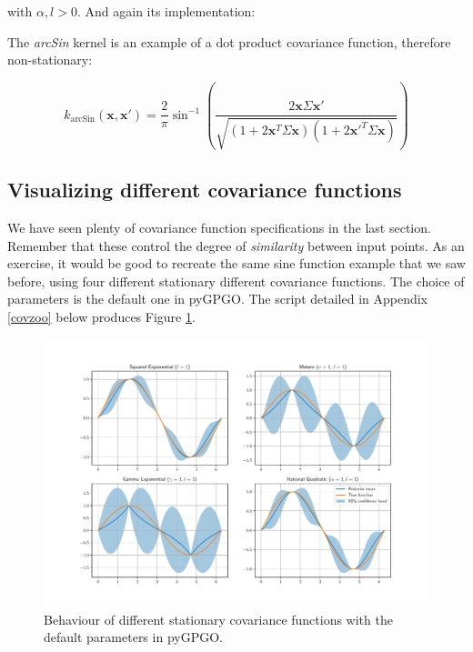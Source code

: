 \documentclass[10pt,a4paper,twoside]{book}
\begin{document}
with $\alpha, l > 0$. And again its implementation:


The \textit{arcSin} kernel is an example of a dot product covariance function, therefore non-stationary:

\begin{equation}
k_{\textrm{arcSin}}(\boldsymbol{x}, \boldsymbol{x'}) = \dfrac{2}{\pi}\sin^{-1}\left(\dfrac{2\boldsymbol{x}\Sigma\boldsymbol{x'}}{\sqrt{(1 + 2\boldsymbol{x}^T\Sigma\boldsymbol{x})(1 + 2\boldsymbol{x'}^T\Sigma\boldsymbol{x})}}   \right)
\end{equation}

\subsection{Visualizing different covariance functions}

We have seen plenty of covariance function specifications in the last section. Remember that these control the degree of \textit{similarity} between input points. As an exercise, it would be good to recreate the same sine function example that we saw before, using four different stationary different covariance functions. The choice of parameters is the default one in pyGPGO. The script detailed in Appendix \ref{covzoo} below produces Figure \ref{fig:zoo}. \\


\begin{figure}
\caption{Behaviour of different stationary covariance functions with the default parameters in pyGPGO.}
\label{fig:zoo}
\includegraphics[width=\textwidth]{figures/chapter2/zoo}
\end{figure}
\end{document}
